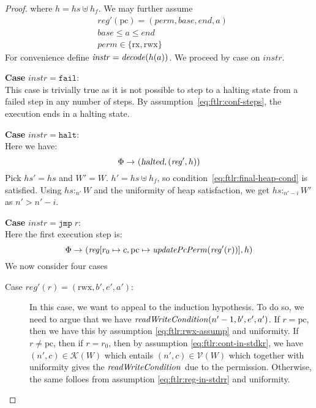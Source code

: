 \documentclass{article}
\newcommand{\var}[1]{\mathit{#1}}
\newcommand{\hs}{\var{hs}}
\newcommand{\pcreg}{\mathrm{pc}}
\newcommand{\addr}{\var{a}}
\newcommand{\start}{\var{base}}
\newcommand{\addrend}{\var{end}}
\newcommand{\reg}{\var{reg}}
\newcommand{\heap}{\var{heap}}
\newcommand{\perm}{\var{perm}}
\newcommand{\instr}{\var{instr}}
\newcommand{\halted}{\textsl{halted}}
\newcommand{\plainfun}[2]{
  \ifthenelse{\equal{#2}{}}
             {\mathit{#1}}
             {\mathit{#1}(#2)}
}
\newcommand{\decode}{\plainfun{decode}{}}
\newcommand{\updatePcPerm}[1]{\plainfun{updatePcPerm}{#1}}
\newcommand{\writeCond}[1]{\plainfun{readWriteCondition}{#1}}
\newcommand{\heapSat}[3][\heap]{#1 :_{#2} #3}
\newcommand{\asmType}{\plaindom{AsmType}}
\newcommand{\plaindom}[1]{\mathrm{#1}}
\newcommand{\intr}[2]{\mathcal{#1}}
\newcommand{\valueintr}[1]{\intr{V}{#1}}
\newcommand{\contintr}[1]{\intr{K}{#1}}
\newcommand{\stdvr}{\valueintr{\asmType}}
\newcommand{\stdkr}{\contintr{\asmType}}
\newcommand{\npair}[2][n]{\left(#1,#2 \right)}
\newcommand{\zinstr}[1]{\mathtt{#1}}
\newcommand{\fail}{\zinstr{fail}}
\newcommand{\halt}{\zinstr{halt}}
\newcommand{\oneinstr}[2]{\zinstr{#1} \; #2}
\newcommand{\jmp}[1]{\oneinstr{jmp}{#1}}
\newcommand{\plainperm}[1]{\mathrm{#1}}
\newcommand{\exec}{\plainperm{rx}}
\newcommand{\rwx}{\plainperm{rwx}}
\newcommand{\step}[1][]{\rightarrow_{#1}}
\begin{document}
\begin{proof}
where $h = \hs \uplus h_f$. We may further assume
\begin{align}
  &\reg'(\pcreg) = (\perm,\start,\addrend,\addr) \nonumber \\
  &\start \leq a \leq  \addrend \nonumber \\
  &\perm \in \{\exec,\rwx\} \nonumber
\end{align}
For convenience define $\instr = \decode(h(a))$. We proceed by case on $\instr$.
\newcommand{\case}[1]{{\bf Case } $\instr=#1$:\\}

\case{\fail} This case is trivially true as it is not possible to step to a halting state from a failed step in any number of steps. By assumption~\ref{eq:ftlr:conf-steps}, the execution ends in a halting state.

\case{\halt} 
Here we have:
\[
  \Phi \step (\halted, (\reg',h))
\]
Pick $\hs' = \hs$ and $W' = W$. $h' = \hs \uplus h_f$, so condition~\ref{eq:ftlr:final-heap-cond} is satisfied. Using $\heapSat[\hs]{n'}{W}$ and the uniformity of heap satisfaction, we get $\heapSat[\hs]{n'-i}{W'}$ as $n' > n'-i$.

\case{\jmp{r}}
Here the first execution step is:
\[
  \Phi \step (\reg[r_0 \mapsto c, \pcreg \mapsto \updatePcPerm{\reg'(r)}],h)
\]
We now consider four cases 
\begin{description}
\item[Case $\reg'(r) = (\rwx,b',e',a')$:] In this case, we want to appeal to the induction hypothesis. To do so, we need to argue that we have $\writeCond{n'-1,b',e',a'}$. If $r=\pcreg$, then we have this by assumption \ref{eq:ftlr:rwx-assump} and uniformity. If $r \neq \pcreg$, then if $r= r_0$, then by assumption \ref{eq:ftlr:cont-in-stdkr}, we have $\npair[n']{c} \in \stdkr(W)$ which entails $\npair[n']{c} \in \stdvr(W)$ which together with uniformity gives the $\writeCond{}$ due to the permission. Otherwise, the same folloes from assumption \ref{eq:ftlr:reg-in-stdrr} and uniformity.


\end{description}
\end{proof}
\end{document}
